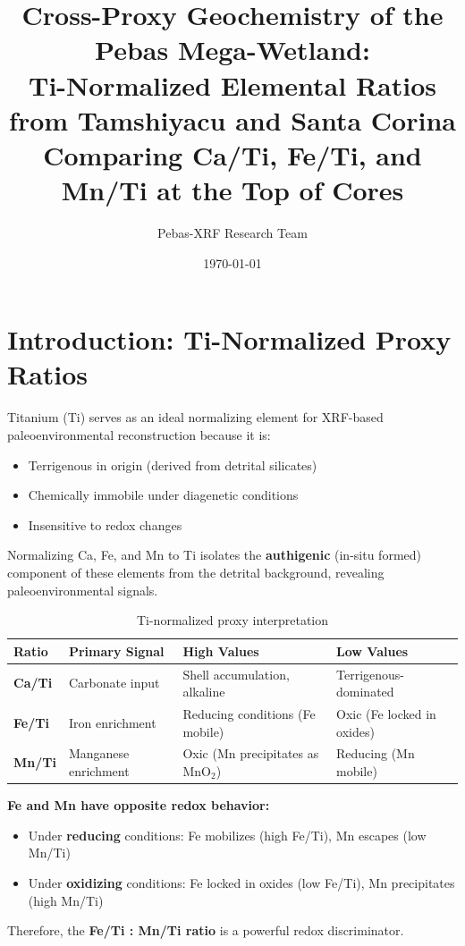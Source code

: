 \documentclass[11pt,a4paper]{article}
\title{Cross-Proxy Geochemistry of the Pebas Mega-Wetland:\\
Ti-Normalized Elemental Ratios from Tamshiyacu and Santa Corina\\[0.5em]
\large Comparing Ca/Ti, Fe/Ti, and Mn/Ti at the Top of Cores}
\author{Pebas-XRF Research Team}
\date{\today}
\begin{document}
\maketitle

\tableofcontents
\newpage

\section{Introduction: Ti-Normalized Proxy Ratios}

Titanium (Ti) serves as an ideal normalizing element for XRF-based paleoenvironmental reconstruction because it is:
\begin{itemize}
    \item Terrigenous in origin (derived from detrital silicates)
    \item Chemically immobile under diagenetic conditions
    \item Insensitive to redox changes
\end{itemize}

Normalizing Ca, Fe, and Mn to Ti isolates the \textbf{authigenic} (in-situ formed) component of these elements from the detrital background, revealing paleoenvironmental signals.

\begin{table}[H]
\centering
\caption{Ti-normalized proxy interpretation}
\begin{tabular}{llll}
\toprule
\textbf{Ratio} & \textbf{Primary Signal} & \textbf{High Values} & \textbf{Low Values} \\
\midrule
\textcolor{CaTi}{\textbf{Ca/Ti}} & Carbonate input & Shell accumulation, alkaline & Terrigenous-dominated \\
\textcolor{FeTi}{\textbf{Fe/Ti}} & Iron enrichment & Reducing conditions (Fe mobile) & Oxic (Fe locked in oxides) \\
\textcolor{MnTi}{\textbf{Mn/Ti}} & Manganese enrichment & Oxic (Mn precipitates as MnO$_2$) & Reducing (Mn mobile) \\
\bottomrule
\end{tabular}
\end{table}

\begin{tcolorbox}[colback=blue!5, colframe=blue!50!black, title=Key Principle]
\textbf{Fe and Mn have opposite redox behavior:}
\begin{itemize}[noitemsep]
    \item Under \textbf{reducing} conditions: Fe mobilizes (high Fe/Ti), Mn escapes (low Mn/Ti)
    \item Under \textbf{oxidizing} conditions: Fe locked in oxides (low Fe/Ti), Mn precipitates (high Mn/Ti)
\end{itemize}
Therefore, the \textbf{Fe/Ti : Mn/Ti ratio} is a powerful redox discriminator.
\end{tcolorbox}
\end{document}
